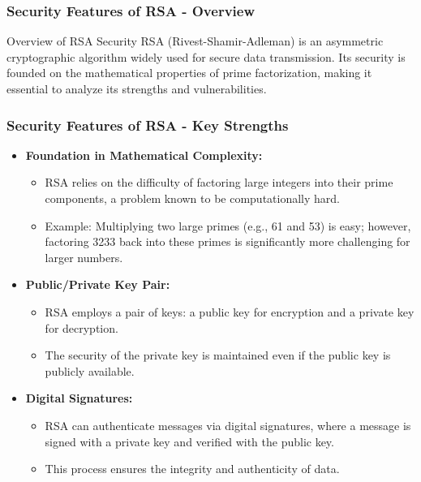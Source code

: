 \documentclass{beamer}
\begin{document}
\begin{frame}[fragile]
    \frametitle{Security Features of RSA - Overview}
    \begin{block}{Overview of RSA Security}
        RSA (Rivest-Shamir-Adleman) is an asymmetric cryptographic algorithm widely used for secure data transmission. Its security is founded on the mathematical properties of prime factorization, making it essential to analyze its strengths and vulnerabilities.
    \end{block}
\end{frame}

\begin{frame}[fragile]
    \frametitle{Security Features of RSA - Key Strengths}
    \begin{itemize}
        \item \textbf{Foundation in Mathematical Complexity:}
        \begin{itemize}
            \item RSA relies on the difficulty of factoring large integers into their prime components, a problem known to be computationally hard.
            \item Example: Multiplying two large primes (e.g., 61 and 53) is easy; however, factoring 3233 back into these primes is significantly more challenging for larger numbers.
        \end{itemize}
        \item \textbf{Public/Private Key Pair:}
        \begin{itemize}
            \item RSA employs a pair of keys: a public key for encryption and a private key for decryption.
            \item The security of the private key is maintained even if the public key is publicly available.
        \end{itemize}
        \item \textbf{Digital Signatures:}
        \begin{itemize}
            \item RSA can authenticate messages via digital signatures, where a message is signed with a private key and verified with the public key.
            \item This process ensures the integrity and authenticity of data.
        \end{itemize}
    \end{itemize}
\end{frame}
\end{document}
